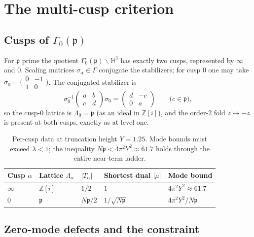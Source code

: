 \documentclass[11pt]{amsart}
\newcommand{\HH}{\mathbb{H}^3}
\newcommand{\ZZ}{\mathbb{Z}}
\newcommand{\p}{\mathfrak{p}}
\begin{document}
\section{The multi-cusp criterion}\label{sec:crit}

\subsection{Cusps of $\Gamma_0(\p)$}

For $\p$ prime the quotient $\Gamma_0(\p)\backslash\HH$ has exactly two
cusps, represented by $\infty$ and $0$.  Scaling matrices
$\sigma_\alpha\in\Gamma$ conjugate the stabilizers; for cusp $0$ one may
take $\sigma_0=\bigl(\begin{smallmatrix}0&-1\\1&0\end{smallmatrix}\bigr)$.
The conjugated stabilizer is
\[
  \sigma_0^{-1}
  \begin{pmatrix}a&b\\c&d\end{pmatrix}
  \sigma_0
  =\begin{pmatrix}d&-c\\0&a\end{pmatrix}
  \qquad\bigl(c\in\p\bigr),
\]
so the cusp-$0$ lattice is $\Lambda_0=\p$ (as an ideal in $\ZZ[i]$), and
the order-$2$ fold $z\mapsto -z$ is present at both cusps, exactly as at
level one.

\begin{table}[ht]
\centering
\begin{tabular}{@{}lllll@{}}
\toprule
Cusp $\alpha$ & Lattice $\Lambda_\alpha$ & $|T_\alpha|$
  & Shortest dual $|\mu|$ & Mode bound \\
\midrule
$\infty$ & $\ZZ[i]$ & $1/2$ & $1$
  & $4\pi^2 Y^2\approx 61.7$ \\
$0$ & $\p$ & $N\p/2$ & $1/\sqrt{N\p}$
  & $4\pi^2 Y^2/N\p$ \\
\bottomrule
\end{tabular}
\caption{Per-cusp data at truncation height $Y=1.25$.  Mode bounds must
exceed $\lambda<1$; the inequality $N\p<4\pi^2 Y^2\approx 61.7$ holds
through the entire near-term ladder.}
\label{tab:cuspdata}
\end{table}

\subsection{Zero-mode defects and the constraint}
\end{document}
